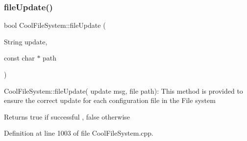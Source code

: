 \subsubsection{\texorpdfstring{file\+Update()}{fileUpdate()}}
{\footnotesize\ttfamily bool Cool\+File\+System\+::file\+Update (\begin{DoxyParamCaption}\item[{String}]{update,  }\item[{const char $\ast$}]{path }\end{DoxyParamCaption})}

Cool\+File\+System\+::file\+Update( update msg, file path)\+: This method is provided to ensure the correct update for each configuration file in the File system

\begin{DoxyReturn}{Returns}
true if successful , false otherwise 
\end{DoxyReturn}


Definition at line 1003 of file Cool\+File\+System.\+cpp.


